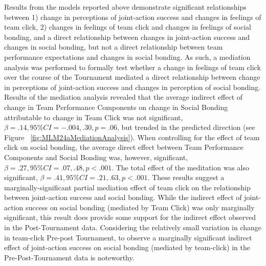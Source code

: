 \begin{CJK}{UTF8}{gbsn}

  Results from the models reported above demonstrate significant relationships between 1) change in perceptions of joint-action success and changes in feelings of team click, 2) changes in feelings of team click and changes in feelings of social bonding, and a direct relationship between changes in joint-action success and changes in social bonding, but not a direct relationship between team performance expectations and changes in social bonding. As such, a mediation analysis was performed to formally test whether a change in feelings of team click over the course of the Tournament mediated a direct relationship between change in perceptions of joint-action success and changes in perception of social bonding.\\

  Results of the mediation analysis revealed that the average indirect effect of change in Team Performance Components on change in Social Bonding attributable to change in Team Click was not significant, $\beta = .14, 95\% CI = -.004 , .30, p = .06$, but trended in the predicted direction (see Figure ~\ref{fig:MLM24aMediationAnalysis}).  When controlling for the effect of team click on social bonding, the average direct effect between Team Performance Components and Social Bonding was, however, significant, $\beta = .27, 95\% CI = .07 , .48, p < .001$.  The total effect of the meditation was also significant, $\beta = .41, 95\% CI = .21 , .63, p < .001$.  These results suggest a marginally-significant partial mediation effect of team click on the relationship between joint-action success and social bonding.  While the indirect effect of joint-action success on social bonding (mediated by Team Click) was only marginally significant, this result does provide some support for the indirect effect observed in the Post-Tournament data.  Considering the relatively small variation in change in team-click Pre-post Tournament, to observe a marginally significant indirect effect of joint-action success on social bonding (mediated by team-click) in the Pre-Post-Tournament data is noteworthy.



\end{CJK}
